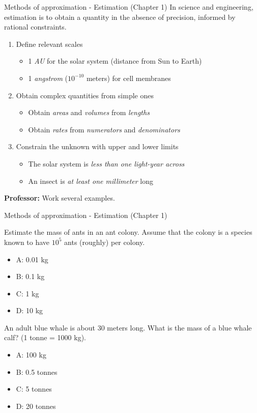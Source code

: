 \documentclass{beamer}
\begin{document}
\begin{frame}{Methods of approximation - Estimation (Chapter 1)}
In science and engineering, \alert{estimation} is to obtain a quantity in the absence of precision, informed by rational constraints.
\begin{enumerate}
\item Define relevant \alert{scales}
\begin{itemize}
\item 1 \textit{AU} for the solar system (distance from Sun to Earth)
\item 1 \textit{angstrom} ($10^{-10}$ meters) for cell membranes
\end{itemize}
\item Obtain \alert{complex quantities} from simple ones
\begin{itemize}
\item Obtain \textit{areas} and \textit{volumes} from \textit{lengths}
\item Obtain \textit{rates} from \textit{numerators} and \textit{denominators}
\end{itemize}
\item Constrain the unknown with \alert{upper} and \alert{lower} limits
\begin{itemize}
\item The solar system is \textit{less than one light-year across}
\item An insect is \textit{at least one millimeter} long
\end{itemize}
\end{enumerate}
\textbf{Professor:} Work several examples.
\end{frame}

\begin{frame}{Methods of approximation - Estimation (Chapter 1)}
\small
\begin{minipage}[b]{0.45\linewidth}
Estimate the mass of ants in an ant colony.  Assume that the colony is a species known to have $10^5$ ants (roughly) per colony.
\begin{itemize}
\item A: 0.01 kg
\item B: 0.1 kg
\item C: 1 kg
\item D: 10 kg
\end{itemize}
\end{minipage}
\hspace{0.5cm}
\begin{minipage}[b]{0.45\linewidth}
An adult blue whale is about 30 meters long.  What is the mass of a blue whale calf? (1 tonne = 1000 kg).
\vspace{0.55cm}
\begin{itemize}
\item A: 100 kg
\item B: 0.5 tonnes
\item C: 5 tonnes
\item D: 20 tonnes
\end{itemize}
\end{minipage}
\end{frame}
\end{document}
